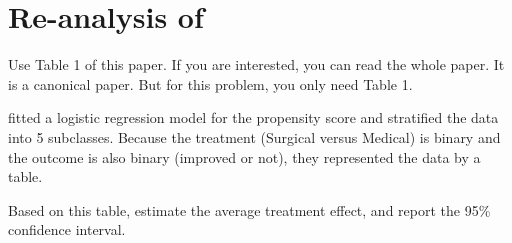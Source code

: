 \documentclass[11pt]{article}
\theoremstyle{definition}
\begin{document}
\section{Re-analysis of \citet{rosenbaum1983assessing}}


Use Table 1 of this paper. If you are interested, you can read the whole paper. It is a canonical paper. But for this problem, you only need Table 1. 

\citet{rosenbaum1983assessing} fitted a logistic regression model for the propensity score and stratified the data into 5 subclasses. Because the treatment (Surgical versus Medical) is binary and the outcome is also binary (improved or not), they represented the data by a table. 


Based on this table, estimate the average treatment effect, and report the 95\% confidence interval. 




\end{document}
